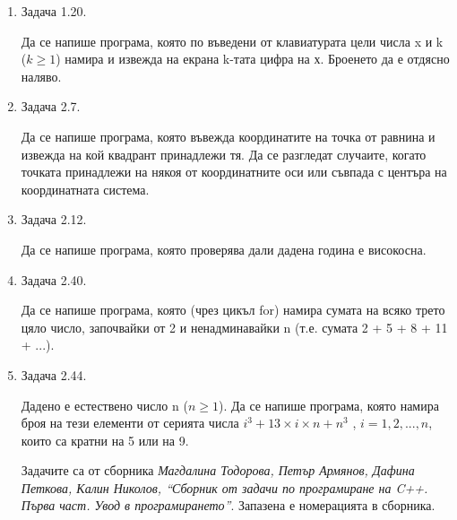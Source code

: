 \documentclass[12pt,a4paper]{article}
\begin{document}
\begin{enumerate}
\begin{enumerate}[a)]
	\end{enumerate}

	\item Задача 1.20.

	Да се напише програма, която по въведени от клавиатурата цели числа x и k ($k \geq 1$) намира и извежда на екрана k-тата цифра на х. Броенето да е отдясно наляво.

	\item Задача 2.7.

	Да се напише програма, която въвежда координатите на точка от равнина и извежда на кой квадрант принадлежи тя. Да се разгледат случаите, когато точката принадлежи на някоя от координатните оси или съвпада с центъра на координатната система.

	\item Задача 2.12.

	Да се напише програма, която проверява дали дадена година е високосна.

	\item Задача 2.40.

	Да се напише програма, която (чрез цикъл for) намира сумата на всяко трето цяло число, започвайки от 2 и ненадминавайки n (т.е. сумата 2 + 5 + 8 + 11 + ...).

	\item Задача 2.44.

	Дадено е естествено число n ($n \geq 1$). Да се напише програма, която намира броя на тези елементи от серията числа $i^3 + 13 \times i \times n + n
	^3$ , $i = 1, 2, ..., n$, които са кратни на 5 или на 9.

	\vspace{20px}

	\small{Задачите са от сборника \textit{Магдалина Тодорова, Петър Армянов, Дафина Петкова, Калин Николов, ``Сборник от задачи по програмиране на C++. Първа част. Увод в програмирането''}. Запазена е номерацията в сборника.}

\end{enumerate}
\end{document}
